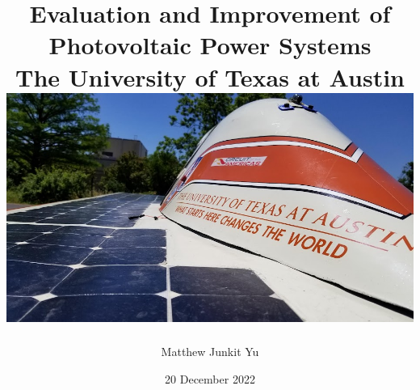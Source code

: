 \documentclass[12pt]{report}
\begin{document}
\title {
    {Evaluation and Improvement of Photovoltaic Power Systems}\\
    {\large The University of Texas at Austin}\\
    {\includegraphics[width=\textwidth]{lonestar_cover.jpg}}
}
\author{Matthew Junkit Yu}
\date{20 December 2022}
\maketitle

{
    \hypersetup{linkcolor=black}
    \tableofcontents
    \listoffigures
    \listoftables
}






{
    \hypersetup{linkcolor=black}
    \printbibliography[heading=bibintoc]
    \begin{appendices}
        
        
        
        
        
        
    \end{appendices}
    \listoftodos[TODOS]
}
\end{document}

